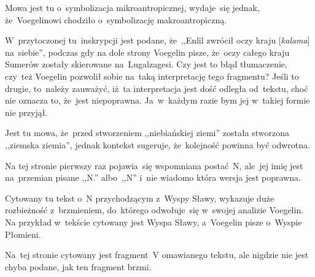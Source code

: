 \documentclass[a4paper,11pt]{article}
\begin{document}
\vspace{\spaceTwo}








\noi {}

\vspace{\spaceFour}

\start {} Mowa jest tu o~symbolizacja mikroantropicznej,
wydaje~się jednak, że~Voegelinowi chodziło o~symbolizację
makroantropiczną.

\vspace{\spaceFour}


\start {} W~przytoczonej tu~inskrypcji jest podane, że~,,Enlil
zwrócił oczy kraju [\emph{kalama}] na~siebie'', podczas gdy na dole
strony Voegelin pisze, że~oczy całego kraju Sumerów zostały skierowane
na~Lugalzagesi. Czy jest to błąd tłumaczenie, czy~też Voegelin
pozwolił sobie na~taką interpretację tego fragmentu? Jeśli to drugie,
to~należy zauważyć, iż~ta interpretacja jest dość odległa od~tekstu,
choć nie oznacza to, że~jest niepoprawna. Ja~w~każdym razie bym jej
w~takiej formie nie przyjął.

\vspace{\spaceFour}


\start {} Jest tu mowa, że~przed stworzeniem ,,niebiańskiej
ziemi'' została stworzona ,,ziemska ziemia'', jednak kontekst
sugeruje, że~kolejność powinna być odwrotna.

\vspace{\spaceFour}


\start {} Na tej stronie pierwszy raz pojawia~się wspomniana
postać~N, ale~jej imię jest na~przemian pisane ,,N.'' albo~,,N'' i~nie
wiadomo która wersja jest poprawna.

\vspace{\spaceFour}


\start {} Cytowany tu tekst o~N przychodzącym z~Wyspy Sławy,
wykazuje duże rozbieżność z~brzmieniem, do~którego odwołuje~się
w~swojej analizie Voegelin. Na przykład w~tekście cytowany jest Wyspa
Sławy, a~Voegelin pisze o~Wyspie Płomieni.

\vspace{\spaceFour}


\start {} Na~tej stronie cytowany jest fragment~V omawianego
tekstu, ale nigdzie nie jest chyba podane, jak ten fragment brzmi.
\end{document}
